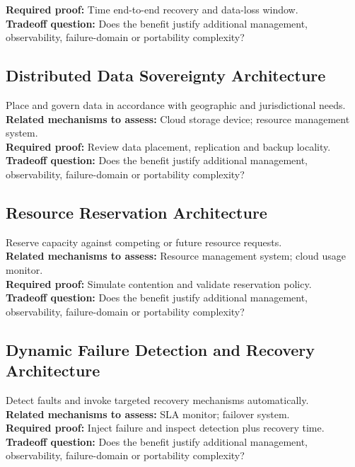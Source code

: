 \documentclass[10pt,letterpaper]{article}
\begin{document}
\textbf{Required proof:} Time end-to-end recovery and data-loss window.\\[3pt]
\textbf{Tradeoff question:} Does the benefit justify additional management, observability, failure-domain or portability complexity?\\[3pt]
\subsection{Distributed Data Sovereignty Architecture}
Place and govern data in accordance with geographic and jurisdictional needs.\\[3pt]
\textbf{Related mechanisms to assess:} Cloud storage device; resource management system.\\[3pt]
\textbf{Required proof:} Review data placement, replication and backup locality.\\[3pt]
\textbf{Tradeoff question:} Does the benefit justify additional management, observability, failure-domain or portability complexity?\\[3pt]
\subsection{Resource Reservation Architecture}
Reserve capacity against competing or future resource requests.\\[3pt]
\textbf{Related mechanisms to assess:} Resource management system; cloud usage monitor.\\[3pt]
\textbf{Required proof:} Simulate contention and validate reservation policy.\\[3pt]
\textbf{Tradeoff question:} Does the benefit justify additional management, observability, failure-domain or portability complexity?\\[3pt]
\subsection{Dynamic Failure Detection and Recovery Architecture}
Detect faults and invoke targeted recovery mechanisms automatically.\\[3pt]
\textbf{Related mechanisms to assess:} SLA monitor; failover system.\\[3pt]
\textbf{Required proof:} Inject failure and inspect detection plus recovery time.\\[3pt]
\textbf{Tradeoff question:} Does the benefit justify additional management, observability, failure-domain or portability complexity?\\[3pt]
\end{document}
